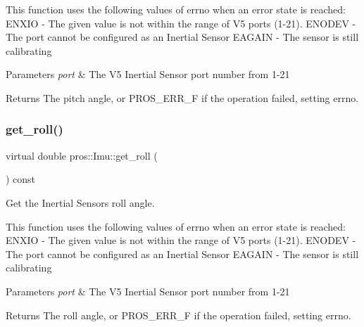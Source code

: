 This function uses the following values of errno when an error state is reached\+: E\+N\+X\+IO -\/ The given value is not within the range of V5 ports (1-\/21). E\+N\+O\+D\+EV -\/ The port cannot be configured as an Inertial Sensor E\+A\+G\+A\+IN -\/ The sensor is still calibrating


\begin{DoxyParams}{Parameters}
{\em port} & The V5 Inertial Sensor port number from 1-\/21 \\
\hline
\end{DoxyParams}
\begin{DoxyReturn}{Returns}
The pitch angle, or P\+R\+O\+S\+\_\+\+E\+R\+R\+\_\+F if the operation failed, setting errno. 
\end{DoxyReturn}
\mbox{\label{classpros_1_1Imu_a8ec8c7bbb7ee9d9d1c9dca5d992c57b1}} 
\subsubsection{\texorpdfstring{get\+\_\+roll()}{get\_roll()}}
{\footnotesize\ttfamily virtual double pros\+::\+Imu\+::get\+\_\+roll (\begin{DoxyParamCaption}{ }\end{DoxyParamCaption}) const\hspace{0.3cm}{\ttfamily [virtual]}}



Get the Inertial Sensor\textquotesingle{}s roll angle. 

This function uses the following values of errno when an error state is reached\+: E\+N\+X\+IO -\/ The given value is not within the range of V5 ports (1-\/21). E\+N\+O\+D\+EV -\/ The port cannot be configured as an Inertial Sensor E\+A\+G\+A\+IN -\/ The sensor is still calibrating


\begin{DoxyParams}{Parameters}
{\em port} & The V5 Inertial Sensor port number from 1-\/21 \\
\hline
\end{DoxyParams}
\begin{DoxyReturn}{Returns}
The roll angle, or P\+R\+O\+S\+\_\+\+E\+R\+R\+\_\+F if the operation failed, setting errno. 
\end{DoxyReturn}
\mbox{\label{classpros_1_1Imu_aa2dd2dec5b1a91d4358c23afd8f0f1bd}} 
